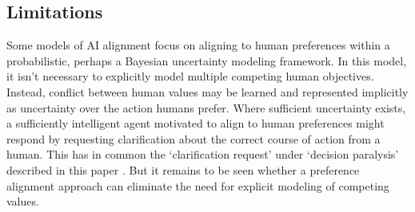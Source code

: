 \subsection{Limitations}



Some models of AI alignment \cite{russell2019human} focus on  aligning to human preferences within a probabilistic, perhaps a Bayesian uncertainty modeling framework.  In this model, it isn't necessary to explicitly model multiple competing human objectives. Instead, conflict between human values may be learned and represented implicitly as uncertainty over the action humans prefer. Where sufficient uncertainty exists, a sufficiently intelligent agent motivated to align to human preferences might respond by requesting clarification about the correct course of action from a human. This has in common the `clarification request' under `decision paralysis' described in this paper%
. But it remains to be seen whether a preference alignment approach can eliminate the need for explicit modeling of competing values.

